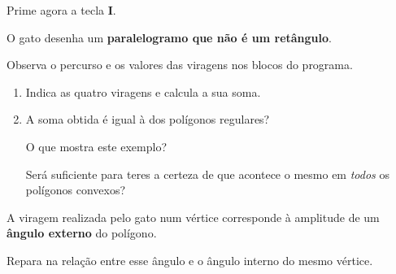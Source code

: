 

Prime agora a tecla \textbf{I}.

O gato desenha um
\textbf{paralelogramo que não é
um retângulo}.

Observa o percurso e os valores
das viragens nos blocos do programa.

\begin{enumerate}[label=\textbf{3.\arabic*.}]

\item
Indica as quatro viragens
e calcula a sua soma.


\item
A soma obtida é igual à dos
polígonos regulares?

O que mostra este exemplo?

Será suficiente para teres
a certeza de que acontece
o mesmo em \emph{todos}
os polígonos convexos?


\end{enumerate}




A viragem realizada pelo gato
num vértice corresponde à amplitude
de um \textbf{ângulo externo}
do polígono.

Repara na relação entre esse ângulo
e o ângulo interno do mesmo vértice.

